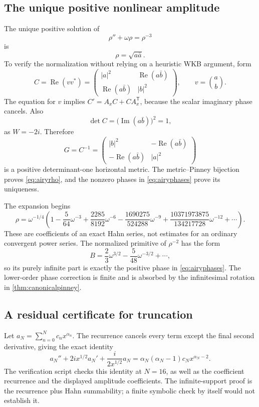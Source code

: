 \documentclass[11pt,a4paper]{article}
\numberwithin{equation}{section}
\theoremstyle{definition}
\theoremstyle{remark}
\begin{document}
\subsection{The unique positive nonlinear amplitude}
The unique positive solution of
\[
 \rho''+\omega\rho=\rho^{-3}
\]
is
\begin{equation}\label{eq:airyrho}
 \rho=\sqrt{a\bar a}.
\end{equation}
To verify the normalization without relying on a heuristic WKB argument,
form
\[
 C=\operatorname{Re}(vv^*)
 =\begin{pmatrix}|a|^2&\operatorname{Re}(a\bar b)\\
                  \operatorname{Re}(a\bar b)&|b|^2\end{pmatrix},
 \qquad v=\binom ab.
\]
The equation for $v$ implies $C'=A_xC+CA_x^{\mathsf T}$, because the scalar
imaginary phase cancels. Also
\[
 \det C=\bigl(\operatorname{Im}(a\bar b)\bigr)^2=1,
\]
as $W=-2i$. Therefore
\begin{equation}\label{eq:airymetric}
 G=C^{-1}=
 \begin{pmatrix}|b|^2&-\operatorname{Re}(a\bar b)\\
 -\operatorname{Re}(a\bar b)&|a|^2\end{pmatrix}
\end{equation}
is a positive determinant-one horizontal metric. The metric--Pinney
bijection proves \eqref{eq:airyrho}, and the nonzero phases in
\eqref{eq:airyphases} prove its uniqueness.

The expansion begins
\begin{equation}\label{eq:rhojet}
 \rho=\omega^{-1/4}\left(
 1-\frac5{64}\omega^{-3}
 +\frac{2285}{8192}\omega^{-6}
 -\frac{1690275}{524288}\omega^{-9}
 +\frac{10371973875}{134217728}\omega^{-12}
 +\cdots\right).
\end{equation}
These are coefficients of an exact Hahn series, not estimates for an
ordinary convergent power series. The normalized primitive of $\rho^{-2}$
has the form
\[
 B=\frac23\omega^{3/2}-\frac5{48}\omega^{-3/2}+\cdots,
\]
so its purely infinite part is exactly the positive phase in
\eqref{eq:airyphases}. The lower-order phase correction is finite and is
absorbed by the infinitesimal rotation in \cref{thm:canonicalpinney}.

\subsection{A residual certificate for truncation}
Let $a_N=\sum_{n=0}^N c_nx^{\alpha_n}$. The recurrence cancels every term
except the final second derivative, giving the exact identity
\begin{equation}\label{eq:airyres}
 a_N''+2ix^{1/2}a_N'+\frac{i}{2x^{1/2}}a_N
    =\alpha_N(\alpha_N-1)c_Nx^{\alpha_N-2}.
\end{equation}
The verification script checks this identity at $N=16$, as well as the
coefficient recurrence and the displayed amplitude coefficients. The
infinite-support proof is the recurrence plus Hahn summability; a finite
symbolic check by itself would not establish it.
\end{document}
